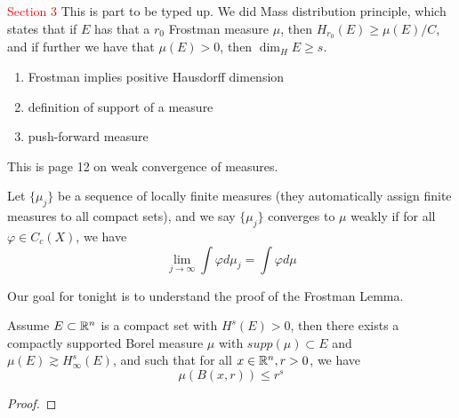 \textcolor{red}{Section 3}
This is part to be typed up. We did Mass distribution principle, which states that if $E$ has that a $r_0$ Frostman measure $\mu$, then $H_{r_0}(E)\geq\mu(E)/C$, and if further we have that $\mu(E)>0$, then $\dim_HE\geq s$.

\begin{enumerate}
    \item Frostman implies positive Hausdorff dimension
    \item definition of support of a measure 
    \item push-forward measure 
\end{enumerate}


This is page 12 on weak convergence of measures.
\begin{definition}
    Let $\{\mu_j\}$ be a sequence of locally finite measures (they automatically assign finite measures to all compact sets), and we say $\{\mu_j\}$ converges to $\mu$ weakly if for all $\varphi\in C_c(X)$, we have
    \begin{equation*}
        \lim_{j\to\infty}\int\varphi d\mu_j=\int \varphi d\mu
    \end{equation*}
\end{definition}

Our goal for tonight is to understand the proof of the Frostman Lemma.
\begin{lemma}
    Assume $E\subset\mathbb{R}^n$ is a compact set with $H^s(E)>0$, then there exists a compactly supported Borel measure $\mu$ with $supp(\mu)\subset E$ and $\mu(E)\gtrsim H_\infty^s(E)$, and such that for all $x\in\mathbb{R}^n, r>0$, we have
    \begin{equation*}
        \mu(B(x,r))\leq r^s
    \end{equation*}
\end{lemma}
\begin{proof}
    
\end{proof}